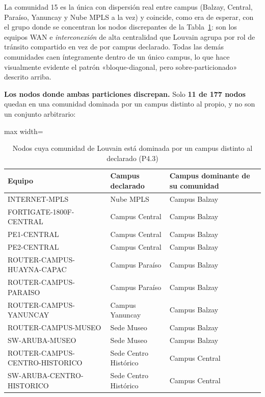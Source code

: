 \documentclass[10pt,a4paper]{extarticle}
\begin{document}
La comunidad 15 es la única con dispersión real entre campus (Balzay, Central, Paraíso,
Yanuncay y Nube MPLS a la vez) y coincide, como era de esperar, con el grupo donde se
concentran los nodos discrepantes de la Tabla~\ref{tab:discrepantes}: son los equipos WAN e
\textit{interconexión} de alta centralidad que Louvain agrupa por rol de tránsito compartido
en vez de por campus declarado. Todas las demás comunidades caen íntegramente dentro de un
único campus, lo que hace visualmente evidente el patrón «bloque-diagonal, pero
sobre-particionado» descrito arriba.

\textbf{Los nodos donde ambas particiones discrepan.} Solo \textbf{11 de 177 nodos} quedan
en una comunidad dominada por un campus distinto al propio, y no son un conjunto arbitrario:

\begin{table}[H]
\centering
\caption{Nodos cuya comunidad de Louvain está dominada por un campus distinto al declarado (P4.3)}
\label{tab:discrepantes}
\small
\begin{adjustbox}{max width=\textwidth}
\begin{tabular}{lll}
\toprule
\textbf{Equipo} & \textbf{Campus declarado} & \textbf{Campus dominante de su comunidad} \\
\midrule
INTERNET-MPLS                  & Nube MPLS             & Campus Balzay \\
FORTIGATE-1800F-CENTRAL        & Campus Central        & Campus Balzay \\
PE1-CENTRAL                    & Campus Central        & Campus Balzay \\
PE2-CENTRAL                    & Campus Central        & Campus Balzay \\
ROUTER-CAMPUS-HUAYNA-CAPAC     & Campus Paraíso        & Campus Balzay \\
ROUTER-CAMPUS-PARAISO          & Campus Paraíso        & Campus Balzay \\
ROUTER-CAMPUS-YANUNCAY         & Campus Yanuncay       & Campus Balzay \\
ROUTER-CAMPUS-MUSEO            & Sede Museo            & Campus Balzay \\
SW-ARUBA-MUSEO                 & Sede Museo            & Campus Balzay \\
ROUTER-CAMPUS-CENTRO-HISTORICO & Sede Centro Histórico & Campus Central \\
SW-ARUBA-CENTRO-HISTORICO      & Sede Centro Histórico & Campus Central \\
\bottomrule
\end{tabular}
\end{adjustbox}
\end{table}
\end{document}
